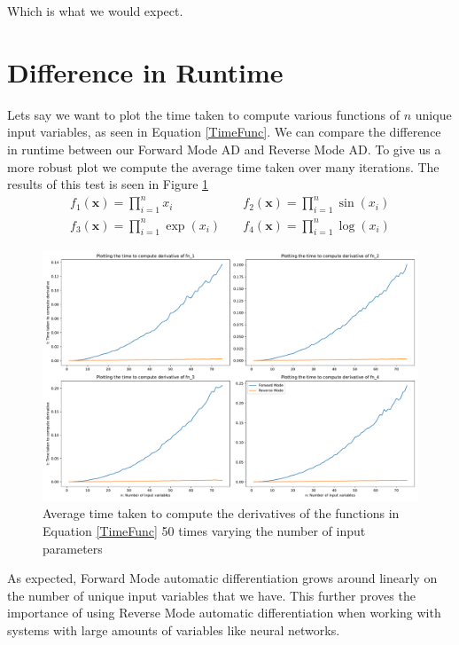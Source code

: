 \documentclass{article}
\begin{document}
Which is what we would expect.




\section{Difference in Runtime}

Lets say we want to plot the time taken to compute various functions of $n$ unique input variables, as seen in Equation \ref{TimeFunc}. We can compare the difference in runtime between our Forward Mode AD and Reverse Mode AD. To give us a more robust plot we compute the average time taken over many iterations. The results of this test is seen in Figure \ref{fig:TimeDiff}
\begin{equation} 
    \label{TimeFunc}
    \begin{split}
        f_1(\textbf{x}) = \prod_{i=1}^n x_i & \quad f_2(\textbf{x}) = \prod_{i=1}^n \sin(x_i) \\
        f_3(\textbf{x}) = \prod_{i=1}^n \exp(x_i) & \quad f_4(\textbf{x}) = \prod_{i=1}^n \log(x_i)
    \end{split}
\end{equation}

\begin{figure}[h]
    \centering
    \includegraphics[width=15cm]{images/Graph_TimeDiff2.pdf}
    \caption{Average time taken to compute the derivatives of the functions in Equation \ref{TimeFunc} 50 times varying the number of input parameters}
    \label{fig:TimeDiff}
\end{figure}

As expected, Forward Mode automatic differentiation grows around linearly on the number of unique input variables that we have. This further proves the importance of using Reverse Mode automatic differentiation when working with systems with large amounts of variables like neural networks.
\end{document}
